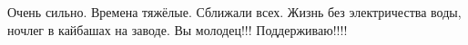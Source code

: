  
 
 
 
 

Очень сильно. Времена тяжёлые. Сближали всех. Жизнь без электричества воды,
ночлег в кайбашах на заводе. Вы молодец!!! Поддерживаю!!!!
